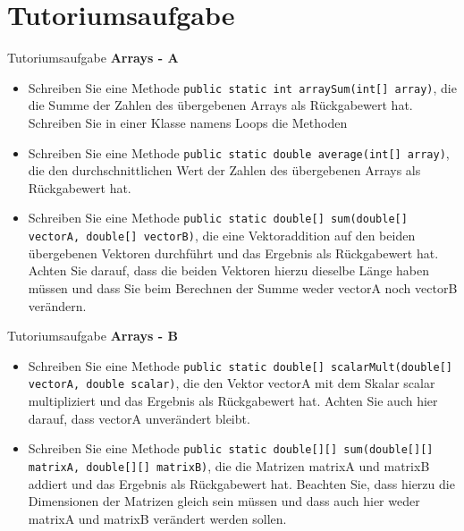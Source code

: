 \documentclass[18pt]{beamer}
\begin{document}
\section{Tutoriumsaufgabe}
\begin{frame}[fragile]{Tutoriumsaufgabe}
\textbf{Arrays - A}
\begin{itemize}

\item \small Schreiben Sie eine Methode \newline
\lstinline{public static int arraySum(int[] array)}, \newline
die die Summe der Zahlen des übergebenen Arrays als Rückgabewert hat.
Schreiben Sie in einer Klasse namens Loops die Methoden

\item Schreiben Sie eine Methode \newline
\lstinline{public static double average(int[] array)}, \newline
die den durchschnittlichen Wert der Zahlen des übergebenen Arrays als Rückgabewert hat.

\item Schreiben Sie eine Methode \newline
\lstinline{public static double[] sum(double[] vectorA, double[] vectorB)}, \newline
die eine Vektoraddition auf den beiden übergebenen Vektoren durchführt und das Ergebnis als
Rückgabewert hat. Achten Sie darauf, dass die beiden Vektoren hierzu dieselbe Länge haben
müssen und dass Sie beim Berechnen der Summe weder vectorA noch vectorB verändern.
\end{itemize}
\end{frame}

\begin{frame}[fragile]{Tutoriumsaufgabe}
\textbf{Arrays - B}
\begin{itemize}

\item \small Schreiben Sie eine Methode \newline
\lstinline{public static double[] scalarMult(double[] vectorA, double scalar)}, \newline
die den Vektor vectorA mit dem Skalar scalar multipliziert und das Ergebnis als Rückgabewert
hat. Achten Sie auch hier darauf, dass vectorA unverändert bleibt.

\item Schreiben Sie eine Methode \newline
\lstinline{public static double[][] sum(double[][] matrixA, double[][] matrixB)}, \newline
die die Matrizen matrixA und matrixB addiert und das Ergebnis als Rückgabewert hat.
Beachten Sie, dass hierzu die Dimensionen der Matrizen gleich sein müssen und dass auch hier
weder matrixA und matrixB verändert werden sollen.
\end{itemize}
\end{frame}
\end{document}
